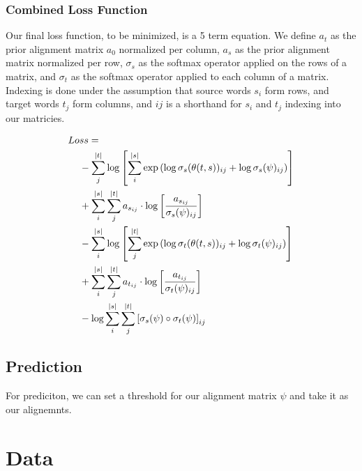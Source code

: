 \documentclass[twoside,twocolumn]{article}
\begin{document}
\subsubsection{Combined Loss Function}
Our final loss function, to be minimized, is a 5 term equation. We define $a_t$ as the prior alignment matrix $a_0$ normalized per column, $a_s$ as the prior alignment matrix normalized per row, $\sigma_s$ as the softmax operator applied on the rows of a matrix, and $\sigma_t$ as the softmax operator applied to each column of a matrix. Indexing is done under the assumption that source words $s_i$ form rows, and target words $t_j$ form columns, and $ij$ is a shorthand for $s_i$ and $t_j$ indexing into our matricies.

\begin{equation}
  \centering
\begin{split}
  Lo&ss = \\
  &- \sum_j^{|t|} \log \left[ \sum_i^{|s|} \exp \left( \log \sigma_s(\theta(t, s))_{ij} + \log \sigma_s(\psi)_{ij} \right) \right] \\
  &+ \sum_i^{|s|} \sum_j^{|t|} a_{s_{ij}} \cdot \log \left[ \frac{a_{s_{ij}}}{\sigma_s(\psi)_{ij}} \right] \\
  &- \sum_i^{|s|} \log \left[ \sum_j^{|t|} \exp \left( \log \sigma_t(\theta(t, s))_{ij} + \log \sigma_t(\psi)_{ij} \right) \right] \\
  &+ \sum_i^{|s|} \sum_j^{|t|} a_{t_{ij}} \cdot \log \left[ \frac{a_{t_{ij}}}{\sigma_t(\psi)_{ij}} \right] \\
  &- \log \sum_i^{|s|} \sum_j^{|t|} \left[ \sigma_s(\psi) \circ \sigma_t(\psi) \right]_{ij} \\
\end{split}
\end{equation}

\subsection{Prediction}

For prediciton, we can set a threshold for our alignment matrix $\psi$ and take it as our alignemnts.

\section{Data}
\end{document}
